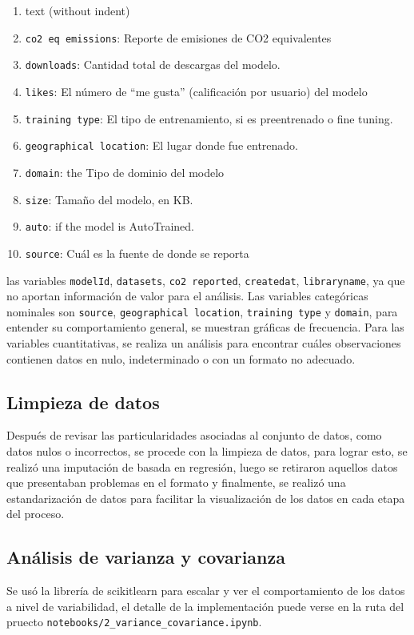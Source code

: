 \documentclass[journal]{IEEEtran}
\begin{document}
	\begin{enumerate}
		\item[]\hspace{-\labelwidth}\hspace{-\labelsep}text (without indent)
		\item \texttt{co2 eq emissions}: Reporte de emisiones de CO2 equivalentes 
		\item \texttt{downloads}: Cantidad total de descargas del modelo.
		\item \texttt{likes}: El número de “me gusta” (calificación por usuario) del modelo
		\item \texttt{training type}: El tipo de entrenamiento, si es preentrenado o fine tuning.
		\item \texttt{geographical location}: El lugar donde fue entrenado.
		\item \texttt{domain}: the Tipo de dominio del modelo
		\item \texttt{size}: Tamaño del modelo, en KB.
		\item \texttt{auto}: if the model is AutoTrained.
		\item \texttt{source}: Cuál es la fuente de donde se reporta
	\end{enumerate}
	las variables \texttt{modelId}, \texttt{datasets}, \texttt{co2 reported}, \texttt{createdat}, \texttt{libraryname}, ya que no aportan información de valor para el análisis.
	Las variables categóricas nominales son  \texttt{source}, \texttt{geographical location}, \texttt{training type} y \texttt{domain}, para entender su comportamiento general, se muestran gráficas de frecuencia. Para las variables cuantitativas, se realiza un análisis para encontrar cuáles observaciones contienen datos en nulo, indeterminado o con un formato no adecuado.
	
	\subsection{Limpieza de datos}
	\label{ssec:pca}
	Después de revisar las particularidades asociadas al conjunto de datos, como datos nulos o incorrectos, se procede con la limpieza de datos, para lograr esto, se realizó una imputación de basada en regresión, luego se retiraron aquellos datos que presentaban problemas en el formato y finalmente, se realizó una estandarización de datos para facilitar la visualización de los datos en cada etapa del proceso.
	\subsection{Análisis de varianza y covarianza}
	\label{ssec:pca}
	Se usó la librería de scikitlearn para escalar y ver el comportamiento de los datos a nivel de variabilidad, el detalle de la implementación puede verse en la ruta del pruecto \texttt{notebooks/2\_variance\_covariance.ipynb}.
	
\end{document}
